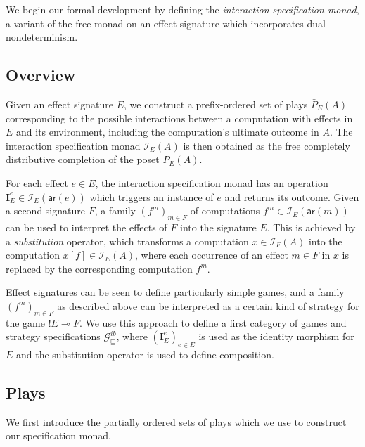 \documentclass[sigplan,screen]{acmart}
\newcommand{\gcat}{\mathcal{G}_{\sqsubseteq}}
\newcommand{\kw}[1]{\ensuremath{ \mathsf{#1} }}
\begin{document}
We begin our formal development
by defining the \emph{interaction specification monad},
a variant of the free monad on an effect signature which
incorporates dual nondeterminism.

\subsection{Overview} %

Given an effect signature $E$,
we construct a prefix-ordered set of plays $\bar{P}_E(A)$
corresponding to the possible interactions between
a computation with effects in $E$
and its environment,
including the computation's ultimate outcome in $A$.
The interaction specification monad $\mathcal{I}_E(A)$ is then obtained
as the free completely distributive completion of the poset $\bar{P}_E(A)$.

For each effect $e \in E$,
the interaction specification monad
has an operation
$\mathbf{I}_E^e \in \mathcal{I}_E(\kw{ar}(e))$
which triggers an instance of $e$ and returns its outcome.
Given a second signature $F$,
a family $(f^m)_{m \in F}$ of computations
$f^m \in \mathcal{I}_E(\kw{ar}(m))$
can be used to interpret the effects of $F$
into the signature $E$.
This is achieved by a \emph{substitution} operator,
which transforms a computation $x \in \mathcal{I}_F(A)$
into the computation $x[f] \in \mathcal{I}_E(A)$,
where each occurrence of an effect $m \in F$ in $x$
is replaced by the corresponding computation $f^m$.

Effect signatures can be seen to define
particularly simple games,
and a family $(f^m)_{m \in F}$ as described above
can be interpreted as
a certain kind of strategy for the game ${!E} \multimap F$.
We use this approach to define
a first category of games and strategy specifications $\gcat^{ib}$,
where $(\mathbf{I}_E^e)_{e \in E}$ is used as
the identity morphism for $E$ and
the substitution operator is used to define composition.


\subsection{Plays} \label{sec:intm:plays} %

We first introduce the partially ordered sets of plays
which we use to construct our specification monad.
\end{document}
